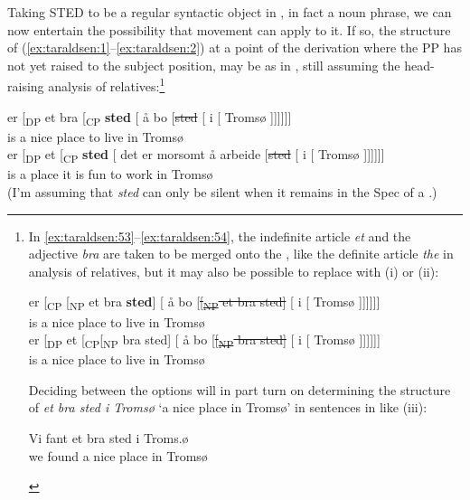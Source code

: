 \documentclass[output=paper]{LSP/langsci}
\begin{document}
Taking STED to be a regular syntactic object in , in fact a noun phrase, we can now entertain the possibility that movement can apply to it. If so, the structure of (\ref{ex:taraldsen:1}--\ref{ex:taraldsen:2}) at a point of the derivation where the PP has not yet raised to the subject position, may be as in , still assuming the head-raising analysis of relatives:\footnote{In \ref{ex:taraldsen:53}--\ref{ex:taraldsen:54}, the indefinite article \textit{et} and the adjective \textit{bra} are taken to be merged onto the  , like the definite article \textit{the} in  analysis of relatives, but it may also be possible to replace  with (i) or (ii):

\begin{xlisti}[(ii)]
\gll  er [\textsubscript{CP} [\textsubscript{NP} et bra \textbf{sted}] [    å bo         [\st{[{\textsubscript{NP}} et bra sted]} [ i [ Tromsø ]]]]]]\\
       is   {}                           {}         a nice     place       {}  to live       {}                             {}  in {} Tromsø\\
\gll  er [\textsubscript{DP} et [\textsubscript{CP}[\textsubscript{NP} bra sted] [ å bo [\st{[{\textsubscript{NP}} bra sted]} [ i [ Tromsø ]]]]]] \\
      is   {}                a                {}                       nice    place  {}      to live              {}        {}  in  {} Tromsø\\
\end{xlisti}

Deciding between the options will in part turn on determining the structure of \textit{et bra sted i Tromsø} `a nice place in Tromsø' in sentences in like (iii):

\begin{xlisti}[(iii)]
\gll Vi fant et bra sted i Troms.ø\\
     we found a nice place in Tromsø\\
\end{xlisti}}

\ea%
    \label{ex:taraldsen:53}
  \ea
\gll  er [\textsubscript{DP} et bra [\textsubscript{CP} \textbf{sted} [ å bo [\st{sted} [ i [ Tromsø ]]]]]] \\
          is    {}   a nice  {}   place {} to live         {} {}     in {} Tromsø\\
\ex
\gll  er [\textsubscript{DP} et [\textsubscript{CP} \textbf{sted} [ det er morsomt å arbeide           [\st{sted} [ i [ Tromsø ]]]]]] \\
          is  {}     a  {}    place  {} it    is  fun        to work  {} {} in {} Tromsø\\
\z
\z
(I’m assuming that \textit{sted} can only be silent when it remains in the Spec of a .)
\end{document}
